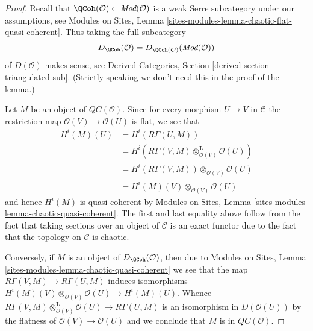 \begin{proof}
Recall that $\QCoh(\mathcal{O}) \subset \textit{Mod}(\mathcal{O})$
is a weak Serre subcategory under our assumptions, see
Modules on Sites, Lemma \ref{sites-modules-lemma-chaotic-flat-quasi-coherent}.
Thus taking the full subcategory
$$
D_\QCoh(\mathcal{O}) = D_{\QCoh(\mathcal{O})}(\textit{Mod}(\mathcal{O}))
$$
of $D(\mathcal{O})$ makes sense, see Derived Categories, Section
\ref{derived-section-triangulated-sub}. (Strictly speaking we don't need
this in the proof of the lemma.)

\medskip\noindent
Let $M$ be an object of $\mathit{QC}(\mathcal{O})$. Since for every
morphism $U \to V$ in $\mathcal{C}$ the restriction map
$\mathcal{O}(V) \to \mathcal{O}(U)$ is flat, we see that
\begin{align*}
H^i(M)(U)
& =
H^i(R\Gamma(U, M)) \\
& =
H^i(R\Gamma(V, M) \otimes_{\mathcal{O}(V)}^\mathbf{L} \mathcal{O}(U)) \\
& =
H^i(R\Gamma(V, M)) \otimes_{\mathcal{O}(V)} \mathcal{O}(U) \\
& =
H^i(M)(V) \otimes_{\mathcal{O}(V)} \mathcal{O}(U)
\end{align*}
and hence $H^i(M)$ is quasi-coherent by
Modules on Sites, Lemma \ref{sites-modules-lemma-chaotic-quasi-coherent}.
The first and last equality above follow from the fact that
taking sections over an object of $\mathcal{C}$ is an exact functor
due to the fact that the topology on $\mathcal{C}$ is chaotic.

\medskip\noindent
Conversely, if $M$ is an object of $D_\QCoh(\mathcal{O})$, then due to
Modules on Sites, Lemma \ref{sites-modules-lemma-chaotic-quasi-coherent}
we see that the map $R\Gamma(V, M) \to R\Gamma(U, M)$ induces isomorphisms
$H^i(M)(V) \otimes_{\mathcal{O}(V)} \mathcal{O}(U) \to H^i(M)(U)$.
Whence $R\Gamma(V, M) \otimes_{\mathcal{O}(V)}^\mathbf{L} \mathcal{O}(U)
\to R\Gamma(U, M)$ is an isomorphism in $D(\mathcal{O}(U))$ by the flatness
of $\mathcal{O}(V) \to \mathcal{O}(U)$ and we
conclude that $M$ is in $\mathit{QC}(\mathcal{O})$.
\end{proof}

